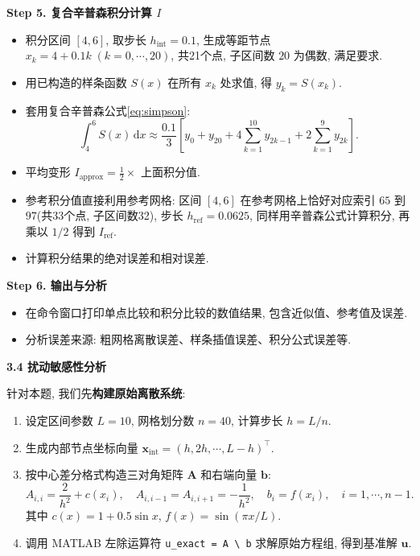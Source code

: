 \documentclass[zihao=-4,a4paper]{ctexart}
\begin{document}
\textbf{Step 5. 复合辛普森积分计算 $I$}
\begin{itemize}[rightmargin=0.5cm]
    \item 积分区间 $[4,6]$, 取步长 $h_{\text{int}} = 0.1$, 生成等距节点 $x_k = 4 + 0.1k\;(k=0,\cdots,20)$, 共21个点, 子区间数 $20$ 为偶数, 满足要求. 
    \item 用已构造的样条函数 $S(x)$ 在所有 $x_k$ 处求值, 得 $y_k = S(x_k)$. 
    \item 套用复合辛普森公式\eqref{eq:simpson}: 
    \[
        \int_4^6 S(x)\,\mathrm{d}x \approx \frac{0.1}{3}\left[ y_0 + y_{20} + 4\sum_{k=1}^{10} y_{2k-1} + 2\sum_{k=1}^{9} y_{2k} \right].
    \]
    \item 平均变形 $I_{\text{approx}} = \frac{1}{2} \times$ 上面积分值. 
    \item 参考积分值直接利用参考网格: 区间 $[4,6]$ 在参考网格上恰好对应索引 $65$ 到 $97$(共33个点, 子区间数32), 步长 $h_{\text{ref}}=0.0625$, 同样用辛普森公式计算积分, 再乘以 $1/2$ 得到 $I_{\text{ref}}$. 
    \item 计算积分结果的绝对误差和相对误差. 
\end{itemize}

\textbf{Step 6. 输出与分析}
\begin{itemize}
    \item 在命令窗口打印单点比较和积分比较的数值结果, 包含近似值、参考值及误差. 
    \item 分析误差来源: 粗网格离散误差、样条插值误差、积分公式误差等. 
\end{itemize}

\noindent\textbf{3.4 扰动敏感性分析}

针对本题, 我们先\textbf{构建原始离散系统}: 
\begin{enumerate}[label=\textbf{Step \arabic*},left=1cm]
    \item 设定区间参数 $L=10$, 网格划分数 $n=40$, 计算步长 $h=L/n$. 
    \item 生成内部节点坐标向量 $\bm{x}_{\text{int}} = (h,2h,\cdots,L-h)^\top$. 
    \item 按中心差分格式构造三对角矩阵 $\bm{A}$ 和右端向量 $\bm{b}$: 
    \[
    A_{i,i} = \frac{2}{h^2} + c(x_i),\quad
    A_{i,i-1} = A_{i,i+1} = -\frac{1}{h^2},\quad
    b_i = f(x_i),\quad i=1,\cdots,n-1.
    \]
    其中 $c(x)=1+0.5\sin x$, $f(x)=\sin(\pi x/L)$. 
    \item 调用 MATLAB 左除运算符 \texttt{u\_exact = A \textbackslash\ b} 求解原始方程组, 得到基准解 $\bm{u}$. 
\end{enumerate}
\end{document}
